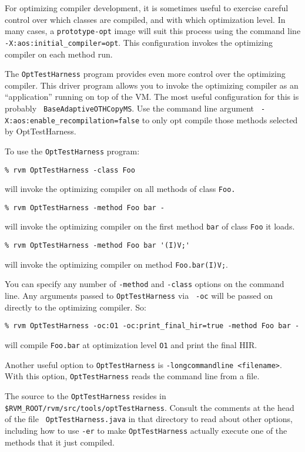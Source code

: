 For optimizing compiler development, it is sometimes useful to exercise
careful control over which classes are compiled, and with which
optimization level.  In many cases, a {\tt prototype-opt} image will
suit this process using the command line {\tt
-X:aos:initial\_compiler=opt}.  This configuration invokes the
optimizing compiler on each method run. 

The {\tt OptTestHarness} program provides even more control over the
optimizing compiler.  This driver program allows you to invoke the
optimizing compiler as an ``application'' running on top of the VM.
The most useful configuration for this is probably {\tt
BaseAdaptiveOTHCopyMS}. Use the command line argument {\tt
-X:aos:enable\_recompilation=false} to only opt compile those methods
selected by OptTestHarness. 

To use the {\tt OptTestHarness} program:
\begin{verbatim}
% rvm OptTestHarness -class Foo
\end{verbatim}
will invoke the optimizing compiler on all methods of class {\tt Foo.}

\begin{verbatim}
% rvm OptTestHarness -method Foo bar - 
\end{verbatim}
will invoke the optimizing compiler on the first method {\tt bar} of class
{\tt Foo} it loads.

\begin{verbatim}
% rvm OptTestHarness -method Foo bar '(I)V;' 
\end{verbatim} 
will invoke the optimizing compiler on method {\tt Foo.bar(I)V;}.

You can specify any number of {\tt -method} and {\tt -class} options on
the command line.  Any arguments passed to {\tt OptTestHarness} via {\tt
-oc} will be passed on directly to the optimizing compiler.  So:

\begin{verbatim}
% rvm OptTestHarness -oc:O1 -oc:print_final_hir=true -method Foo bar -
\end{verbatim} 
will compile {\tt Foo.bar} at optimization level {\tt O1} and print
the final HIR.

Another useful option to {\tt OptTestHarness} is {\tt -longcommandline
<filename>}. With this option, {\tt OptTestHarness} reads the command line
from a file.

The source to the {\tt OptTestHarness} resides in
{\tt \$RVM\_ROOT/rvm/src/tools/\-opt\-Test\-Har\-ness}.  Consult the comments
at the head of the file {\tt
OptTestHarness.java} in that directory to read about other options,
including how to use {\tt -er} to make {\tt OptTestHarness} 
actually execute one of the methods that it just compiled.
